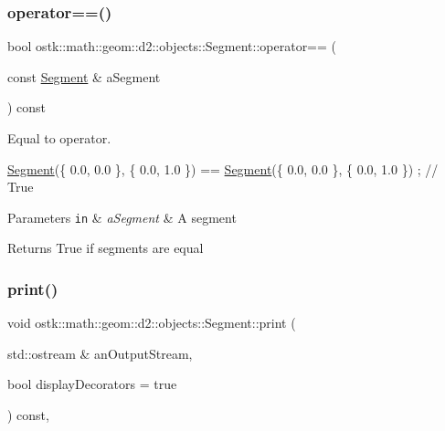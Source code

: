 \subsubsection{\texorpdfstring{operator==()}{operator==()}}
{\footnotesize\ttfamily bool ostk\+::math\+::geom\+::d2\+::objects\+::\+Segment\+::operator== (\begin{DoxyParamCaption}\item[{const \hyperlink{classostk_1_1math_1_1geom_1_1d2_1_1objects_1_1_segment}{Segment} \&}]{a\+Segment }\end{DoxyParamCaption}) const}



Equal to operator. 


\begin{DoxyCode}
\hyperlink{classostk_1_1math_1_1geom_1_1d2_1_1objects_1_1_segment_a56c91f22315d7cefe9d5e9973330028d}{Segment}(\{ 0.0, 0.0 \}, \{ 0.0, 1.0 \}) == \hyperlink{classostk_1_1math_1_1geom_1_1d2_1_1objects_1_1_segment_a56c91f22315d7cefe9d5e9973330028d}{Segment}(\{ 0.0, 0.0 \}, \{ 0.0, 1.0 \}) ; \textcolor{comment}{// True}
\end{DoxyCode}



\begin{DoxyParams}[1]{Parameters}
\mbox{\tt in}  & {\em a\+Segment} & A segment \\
\hline
\end{DoxyParams}
\begin{DoxyReturn}{Returns}
True if segments are equal 
\end{DoxyReturn}
\mbox{\label{classostk_1_1math_1_1geom_1_1d2_1_1objects_1_1_segment_a475ba5efb353218779018b9be88be276}} 
\subsubsection{\texorpdfstring{print()}{print()}}
{\footnotesize\ttfamily void ostk\+::math\+::geom\+::d2\+::objects\+::\+Segment\+::print (\begin{DoxyParamCaption}\item[{std\+::ostream \&}]{an\+Output\+Stream,  }\item[{bool}]{display\+Decorators = {\ttfamily true} }\end{DoxyParamCaption}) const\hspace{0.3cm}{\ttfamily [override]}, {\ttfamily [virtual]}}



